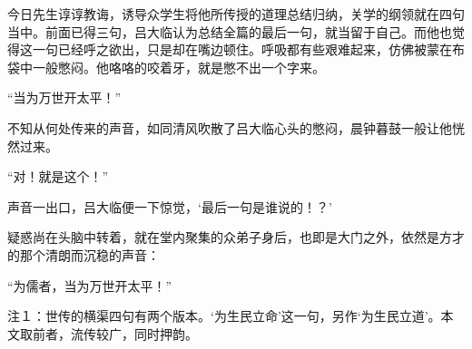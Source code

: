 今日先生谆谆教诲，诱导众学生将他所传授的道理总结归纳，关学的纲领就在四句当中。前面已得三句，吕大临认为总结全篇的最后一句，就当留于自己。而他也觉得这一句已经呼之欲出，只是却在嘴边顿住。呼吸都有些艰难起来，仿佛被蒙在布袋中一般憋闷。他咯咯的咬着牙，就是憋不出一个字来。

“当为万世开太平！”

不知从何处传来的声音，如同清风吹散了吕大临心头的憋闷，晨钟暮鼓一般让他恍然过来。

“对！就是这个！”

声音一出口，吕大临便一下惊觉，‘最后一句是谁说的！？’

疑惑尚在头脑中转着，就在堂内聚集的众弟子身后，也即是大门之外，依然是方才的那个清朗而沉稳的声音：

“为儒者，当为万世开太平！”

注１：世传的横渠四句有两个版本。‘为生民立命’这一句，另作‘为生民立道’。本文取前者，流传较广，同时押韵。

